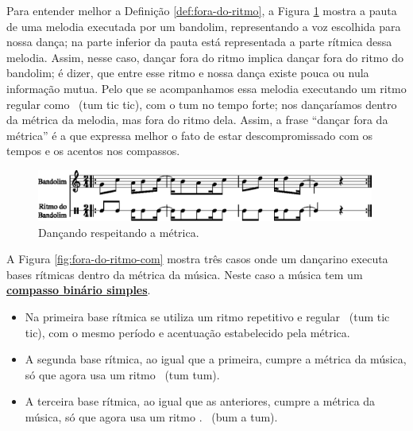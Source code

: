Para entender melhor a Definição \ref{def:fora-do-ritmo}, a 
Figura \ref{fig:fora-do-ritmo-0-1} mostra a pauta de uma melodia executada por um bandolim, 
representando a voz escolhida para nossa dança; 
na parte inferior da pauta está representada a parte rítmica dessa melodia.
Assim, nesse caso, dançar fora do ritmo implica dançar fora do ritmo do bandolim;
é dizer, que entre esse ritmo e nossa dança existe pouca ou nula informação mutua.
Pelo que se acompanhamos essa melodia executando um ritmo regular como 
\Vier \Acht \Acht~(tum tic tic), com o tum no tempo forte;
nos dançaríamos dentro da métrica da melodia,
mas fora do ritmo dela. 
Assim, a frase ``dançar fora da métrica'' é a que expressa melhor o fato de estar descompromissado com os tempos
e os acentos nos compassos. 
\begin{figure}[!h]
    \centering 
    \includegraphics[width=0.99\textwidth]{chapters/cap-musicalidade/fora-do-ritmo-0-1.eps}
    \caption{Dançando respeitando a métrica.}
    \label{fig:fora-do-ritmo-0-1}
\end{figure}

\begin{example}
A Figura \ref{fig:fora-do-ritmo-com} mostra três casos onde um dançarino
executa bases rítmicas dentro da métrica da música. 
Neste caso a música  tem um \hyperref[subsec:compassobinario]{\textbf{compasso binário simples}}.
\begin{itemize}
\item Na primeira base rítmica se utiliza um ritmo repetitivo e regular \Vier \Acht \Acht~(tum tic tic),
com o mesmo período e acentuação estabelecido pela métrica. 
\item A segunda base rítmica, ao igual que a primeira, cumpre a métrica da música,
só que agora usa um ritmo \Vier \Vier~(tum tum).
\item A terceira base rítmica, ao igual que as anteriores, cumpre a métrica da música,
só que agora usa um ritmo \Acht. \Sech \Vier~(bum a tum).
\end{itemize}
\end{example}

